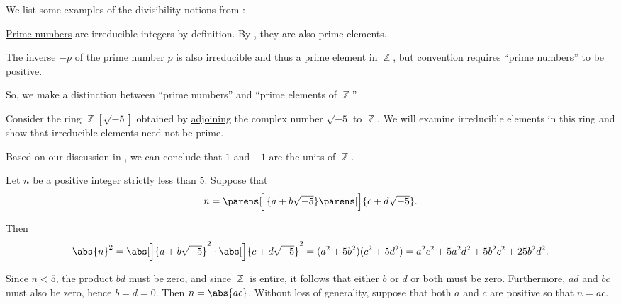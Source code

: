 \begin{example}\label{ex:def:domain_divisibility}
  We list some examples of the divisibility notions from :
  \begin{thmenum}
     \hyperref[def:prime_number]{Prime numbers} are irreducible integers by definition. By , they are also prime elements.

    The inverse \( -p \) of the prime number \( p \) is also irreducible and thus a prime element in \( \BbbZ \), but convention requires \enquote{prime numbers} to be positive.

    So, we make a distinction between \enquote{prime numbers} and \enquote{prime elements of \( \BbbZ \)}

     Consider the ring \( \BbbZ[\sqrt{-5}] \) obtained by \hyperref[def:semiring_adjunction]{adjoining} the complex number \( \sqrt{-5} \) to \( \BbbZ \). We will examine irreducible elements in this ring and show that irreducible elements need not be prime.

    Based on our discussion in , we can conclude that \( 1 \) and \( -1 \) are the units of \( \BbbZ \).

    Let \( n \) be a positive integer strictly less than \( 5 \). Suppose that
    \begin{equation}\label{eq:ex:def:domain_divisibility/irreducible_not_prime/decomposition}
      n = \parens[\Big]{ a + b \sqrt{-5} }\parens[\Big]{ c + d \sqrt{-5}}.
    \end{equation}

    Then
    \begin{equation}\label{eq:ex:def:domain_divisibility/irreducible_not_prime/abs}
      \abs{n}^2
      =
      \abs[\Big]{a + b \sqrt{-5}}^2 \cdot \abs[\Big]{c + d \sqrt{-5}}^2
      =
      (a^2 + 5b^2) (c^2 + 5d^2)
      =
      a^2 c^2 + 5a^2 d^2 + 5b^2 c^2 + 25 b^2 d^2.
    \end{equation}

    Since \( n < 5 \), the product \( bd \) must be zero, and since \( \BbbZ \) is entire, it follows that either \( b \) or \( d \) or both must be zero. Furthermore, \( ad \) and \( bc \) must also be zero, hence \( b = d = 0 \). Then \( n = \abs{ac} \). Without loss of generality, suppose that both \( a \) and \( c \) are positive so that \( n = ac \).


\end{thmenum}
\end{example}
